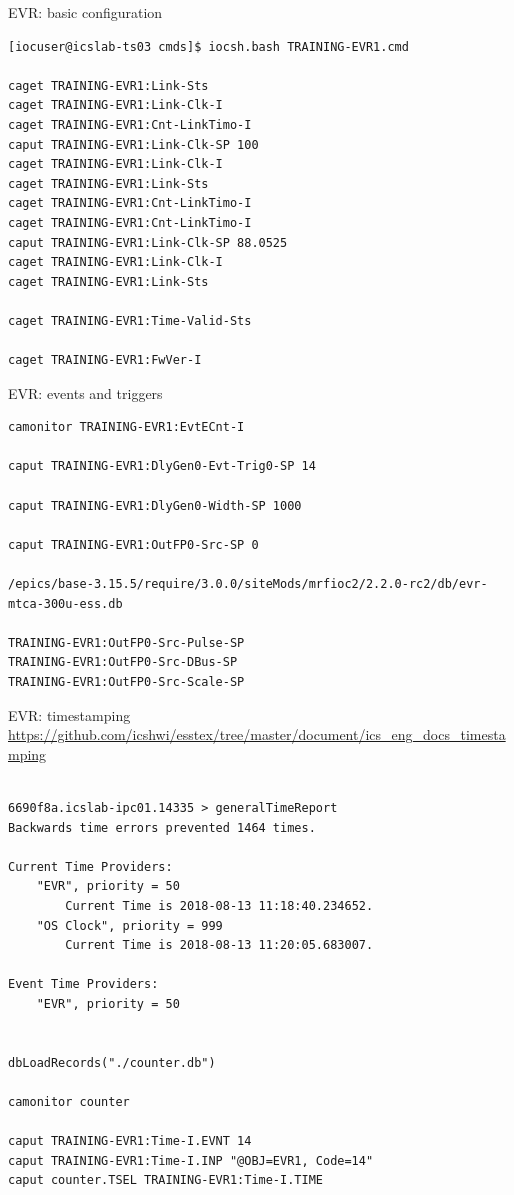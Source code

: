 \documentclass[
  9pt
  , table
  , ignorenonframetext
]{beamer}
\begin{document}
\begin{frame}[fragile]{EVR: basic configuration}
\begin{lstlisting}[style=termstyle,breaklines=true,basicstyle=\scriptsize]
[iocuser@icslab-ts03 cmds]$ iocsh.bash TRAINING-EVR1.cmd

caget TRAINING-EVR1:Link-Sts
caget TRAINING-EVR1:Link-Clk-I
caget TRAINING-EVR1:Cnt-LinkTimo-I
caput TRAINING-EVR1:Link-Clk-SP 100
caget TRAINING-EVR1:Link-Clk-I
caget TRAINING-EVR1:Link-Sts
caget TRAINING-EVR1:Cnt-LinkTimo-I
caget TRAINING-EVR1:Cnt-LinkTimo-I
caput TRAINING-EVR1:Link-Clk-SP 88.0525
caget TRAINING-EVR1:Link-Clk-I
caget TRAINING-EVR1:Link-Sts

caget TRAINING-EVR1:Time-Valid-Sts

caget TRAINING-EVR1:FwVer-I

\end{lstlisting}
\end{frame}

\begin{frame}[fragile]{EVR: events and triggers}
\begin{lstlisting}[style=termstyle,breaklines=true,basicstyle=\scriptsize]
camonitor TRAINING-EVR1:EvtECnt-I

caput TRAINING-EVR1:DlyGen0-Evt-Trig0-SP 14

caput TRAINING-EVR1:DlyGen0-Width-SP 1000

caput TRAINING-EVR1:OutFP0-Src-SP 0

/epics/base-3.15.5/require/3.0.0/siteMods/mrfioc2/2.2.0-rc2/db/evr-mtca-300u-ess.db

TRAINING-EVR1:OutFP0-Src-Pulse-SP
TRAINING-EVR1:OutFP0-Src-DBus-SP
TRAINING-EVR1:OutFP0-Src-Scale-SP

\end{lstlisting}
\end{frame}

\begin{frame}[fragile]{EVR: timestamping}
\url{https://github.com/icshwi/esstex/tree/master/document/ics_eng_docs_timestamping}
\begin{lstlisting}[style=termstyle,breaklines=true,basicstyle=\scriptsize]

6690f8a.icslab-ipc01.14335 > generalTimeReport
Backwards time errors prevented 1464 times.

Current Time Providers:
    "EVR", priority = 50
        Current Time is 2018-08-13 11:18:40.234652.
    "OS Clock", priority = 999
        Current Time is 2018-08-13 11:20:05.683007.

Event Time Providers:
    "EVR", priority = 50


dbLoadRecords("./counter.db")

camonitor counter

caput TRAINING-EVR1:Time-I.EVNT 14
caput TRAINING-EVR1:Time-I.INP "@OBJ=EVR1, Code=14"
caput counter.TSEL TRAINING-EVR1:Time-I.TIME

\end{lstlisting}
\end{frame}
\end{document}
